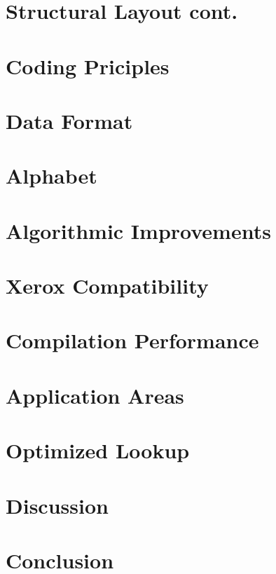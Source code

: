 \documentclass{llncs}
\begin{document}
\section*{Structural Layout cont.}


\section*{Coding Priciples}


\section*{Data Format}

\section*{Alphabet}

\section*{Algorithmic Improvements}

\section*{Xerox Compatibility}

\section*{Compilation Performance}

\section*{Application Areas}

\section*{Optimized Lookup}

\section*{Discussion}

\section*{Conclusion}

%
%
%
%
\begin{thebibliography}{}

\end{thebibliography}
\clearpage
{} %
\renewcommand{\indexname}{Author Index}
\printindex
\clearpage
{} %
\renewcommand{\indexname}{Subject Index}

\end{document}
